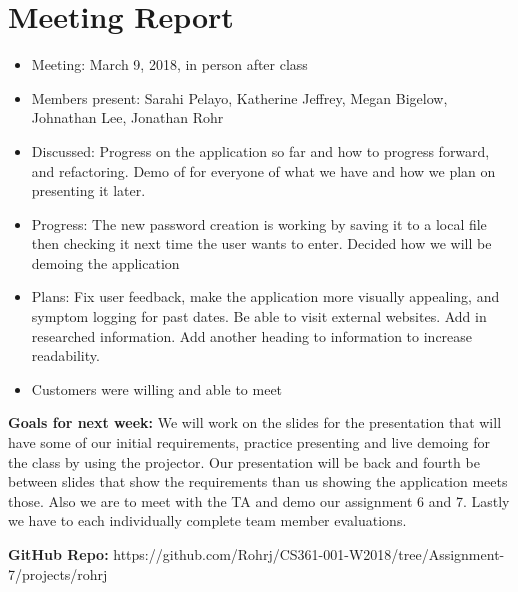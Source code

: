 \documentclass[letterpaper,12pt,titlepage]{article}
\begin{document}
\section{Meeting Report}
\begin{itemize}
\item Meeting: March 9, 2018, in person after class
\item Members present: Sarahi Pelayo, Katherine Jeffrey, Megan Bigelow, Johnathan Lee, Jonathan Rohr
\item Discussed: Progress on the application so far and how to progress forward, and refactoring. Demo of for everyone of what we have and how we plan on presenting it later.
\item Progress:  The new password creation is working by saving it to a local file then checking it next time the user wants to enter. Decided how we will be demoing the application
\item Plans: Fix user feedback, make the application more visually appealing, and symptom logging for past dates. Be able to visit external websites. Add in researched information. Add another heading to information to increase readability.
\item Customers were willing and able to meet
\end{itemize}
\textbf{Goals for next week:}
\newline
We will work on the slides for the presentation that will have some of our initial requirements, practice presenting and live demoing for the class by using the projector. Our presentation will be  back and fourth be between slides that show the requirements than us showing the application meets those. Also we are to meet with the TA and demo our assignment 6 and 7. Lastly we have to each individually complete team member evaluations.
\newpage



\textbf{GitHub Repo:}
https://github.com/Rohrj/CS361-001-W2018/tree/Assignment-7/projects/rohrj
\end{document}
